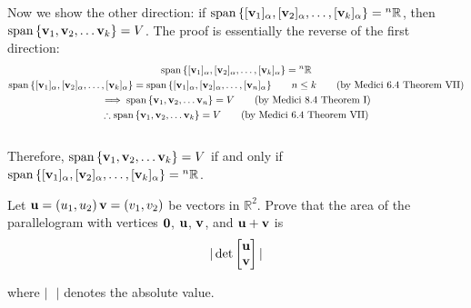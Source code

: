 \documentclass[10pt]{exam}
\newcommand{\noin}{\noindent}
\begin{document}
{{			Now we show the other direction: if $\mathrm{span}\, \{ [{\bf v}_1]_{\alpha}, [{\bf v}_2]_{\alpha}, \dots, [{\bf v}_k]_{\alpha} \} = {^n}\mathbb R$, then $\mathrm{span}\, \{ {\bf v}_1, {\bf v}_2, \dots {\bf v}_k \}=V$. The proof is essentially the reverse of the first direction:
			\begin{gather*}
				\mathrm{span}\, \{ [{\bf v}_1]_{\alpha}, [{\bf v}_2]_{\alpha}, \dots, [{\bf v}_k]_{\alpha} \} = {^n}\mathbb R\\
				\mathrm{span}\, \{ [{\bf v}_1]_{\alpha}, [{\bf v}_2]_{\alpha}, \dots, [{\bf v}_k]_{\alpha} \} = \mathrm{span}\, \{ [{\bf v}_1]_{\alpha}, [{\bf v}_2]_{\alpha}, \dots, [{\bf v}_n]_{\alpha} \} \quad\quad n\leq k \quad\quad \text{(by Medici 6.4 Theorem VII)}\\
				\implies \mathrm{span}\, \{ {\bf v}_1, {\bf v}_2, \dots {\bf v}_n \} = V \quad\quad \text{(by Medici 8.4 Theorem I)}\\
				\therefore \mathrm{span}\, \{ {\bf v}_1, {\bf v}_2, \dots {\bf v}_k \} = V \quad\quad \text{(by Medici 6.4 Theorem VII)}
			\end{gather*}\\

			Therefore, $\mathrm{span}\, \{ {\bf v}_1, {\bf v}_2, \dots {\bf v}_k \}=V$ if and only if $\mathrm{span}\, \{ [{\bf v}_1]_{\alpha}, [{\bf v}_2]_{\alpha}, \dots, [{\bf v}_k]_{\alpha} \} = {^n}\mathbb R$.


			}
		}
	





\pagebreak 


\noin {\bf 2.}   Let ${\bf u}=(u_1, u_2)\, {\bf v}=(v_1, v_2)$ be vectors in $\mathbb R^2$.  Prove that the area of the parallelogram with vertices ${\bf 0}$, ${\bf u}$, ${\bf v}$, and ${\bf u}+{\bf v}$ is
$$| \det \begin{bmatrix} {\bf u} \\ {\bf v} \end{bmatrix} |$$

\noin where $| \ \ \ |$ denotes the absolute value.
\end{document}
